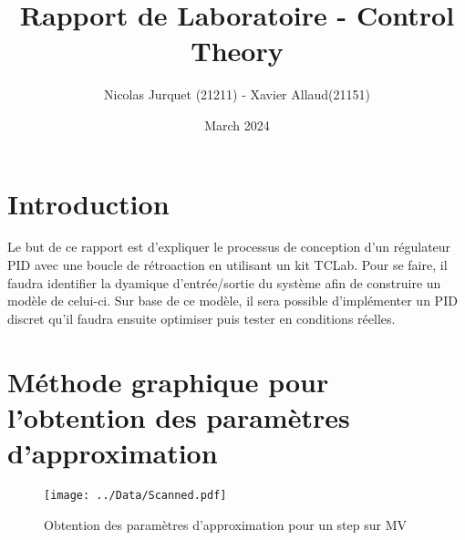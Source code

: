 \documentclass{article}
\title{Rapport de Laboratoire - Control Theory}
\author{Nicolas Jurquet (21211) - Xavier Allaud(21151)}
\date{March 2024}
\begin{document}
\maketitle

\section{Introduction}
Le but de ce rapport est d'expliquer le processus de conception d'un régulateur PID avec une boucle de rétroaction en utilisant un 
kit TCLab. Pour se faire, il faudra identifier la dyamique d'entrée/sortie du système afin de construire 
un modèle de celui-ci. Sur base de ce modèle, il sera possible d'implémenter un PID discret qu'il faudra 
ensuite optimiser puis tester en conditions réelles.
\tableofcontents

\newpage



\newpage


\newpage


\newpage


\newpage


\newpage
\appendix
\section{Méthode graphique pour l'obtention des paramètres d'approximation}
\label{appendix:MV_graphical_method}
\begin{figure}[H]
    \centering
    \texttt{[image: ../Data/Scanned.pdf]}
    \caption{Obtention des paramètres d'approximation pour un step sur MV}
\end{figure}
\end{document}
